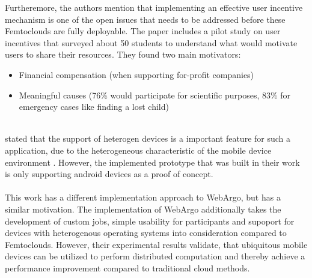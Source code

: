 Furtheremore, the authors mention that implementing an effective user incentive mechanism is one of the open issues that needs to be addressed before these Femtoclouds are fully deployable. The paper includes a pilot study on user incentives that surveyed about 50 students to understand what would motivate users to share their resources. They found two main motivators:
\begin{itemize}
  \item Financial compensation (when supporting for-profit companies)
  \item Meaningful causes (76\% would participate for scientific purposes, 83\% for emergency cases like finding a lost child)
\end{itemize}
~\\
\citeauthor{relatedwork:mobilecloud} stated that the support of heterogen devices is a important feature for such a application, due to the heterogeneous characteristic of the mobile device environment \cite{relatedwork:mobilecloud}. However, the implemented prototype that was built in their work is only supporting android devices as a proof of concept.
\\~\\
This work has a different implementation approach to WebArgo, but has a similar motivation. The implementation of WebArgo additionally takes the development of custom jobs, simple usability for participants and supoport for devices with heterogenous operating systems into consideration compared to Femtoclouds. However, their experimental results validate, that ubiquitous mobile devices can be utilized to perform distributed computation and thereby achieve a performance improvement compared to traditional cloud methods.